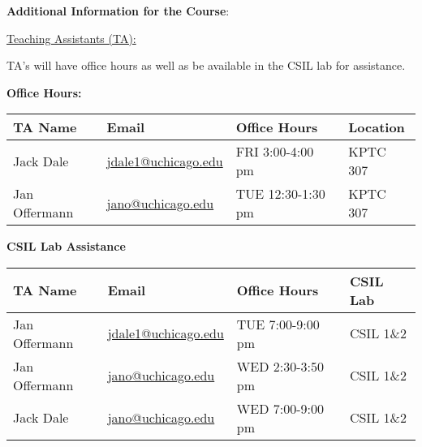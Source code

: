 \noindent \textbf {\Large \sc Additional Information for the Course}:

\vspace{1cm}

\noindent \underline{Teaching Assistants (TA):}

\noindent TA's will have office hours as well as be available in the CSIL lab for assistance.

\textbf{Office Hours:}

\begin{tabular}{l l | l | l }

TA Name & Email & Office Hours & Location \\ \hline

Jack Dale          & \href{mailto:jdale1@uchicago.edu}{jdale1@uchicago.edu}  & FRI  3:00-4:00 pm  & KPTC 307 \\
Jan Offermann      & \href{mailto:jano@uchicago.edu}{jano@uchicago.edu}      & TUE 12:30-1:30 pm  & KPTC 307 \\


\end{tabular}

\vspace{1cm}

\textbf{CSIL Lab Assistance}

\begin{tabular}{l l | l | l }

TA Name & Email & Office Hours & CSIL Lab \\ \hline

Jan Offermann          & \href{mailto:jdale1@uchicago.edu}{jdale1@uchicago.edu}  & TUE  7:00-9:00 pm  & CSIL 1\&2 \\
Jan Offermann      & \href{mailto:jano@uchicago.edu}{jano@uchicago.edu}      & WED  2:30-3:50 pm  & CSIL 1\&2 \\
Jack Dale     & \href{mailto:jano@uchicago.edu}{jano@uchicago.edu}      & WED  7:00-9:00 pm  & CSIL 1\&2 \\


\end{tabular}

\vspace{1cm}

